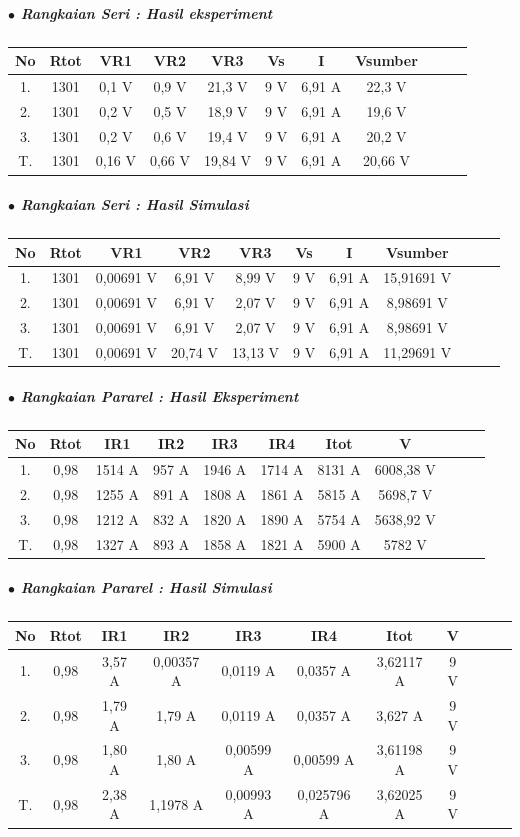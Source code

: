 \documentclass[12pt,a4paper]{article}
\begin{document}
\subparagraph*{$\bullet$ Rangkaian Seri : Hasil eksperiment }
\subparagraph*{ }
\begin{tabular}{|c|c|c|c|c|c|c|c|c|c|c|}        \hline
No & Rtot & VR1 & VR2 & VR3 & Vs & I & Vsumber \\ \hline 
1. & 1301  & 0,1 V & 0,9 V & 21,3 V & 9 V & 6,91 A & 22,3 V \\ \hline
2. & 1301  & 0,2 V & 0,5 V & 18,9 V & 9 V & 6,91 A & 19,6 V \\ \hline
3. & 1301  & 0,2 V & 0,6 V & 19,4 V & 9 V & 6,91 A & 20,2 V  \\ \hline
T. & 1301  & 0,16 V & 0,66 V & 19,84 V & 9 V & 6,91 A & 20,66 V \\ \hline
 \end{tabular}

\subparagraph*{$\bullet$ Rangkaian Seri : Hasil Simulasi }
\subparagraph*{ }
\begin{tabular}{|c|c|c|c|c|c|c|c|c|c|c|}        \hline
No & Rtot & VR1 & VR2 & VR3 & Vs & I & Vsumber \\ \hline 
1. & 1301  & 0,00691 V & 6,91 V & 8,99 V & 9 V & 6,91 A & 15,91691 V  \\ \hline
2. & 1301  & 0,00691 V & 6,91 V & 2,07 V & 9 V & 6,91 A & 8,98691 V  \\ \hline
3. & 1301  & 0,00691 V & 6,91 V & 2,07 V & 9 V & 6,91 A & 8,98691 V \\ \hline
T. & 1301  & 0,00691 V & 20,74 V & 13,13 V & 9 V & 6,91 A & 11,29691 V \\ \hline
 \end{tabular}

\subparagraph*{$\bullet$ Rangkaian Pararel : Hasil Eksperiment }
\subparagraph*{ }
\begin{tabular}{|c|c|c|c|c|c|c|c|c|c|c|}        \hline
No & Rtot & IR1 & IR2 & IR3 & IR4 & Itot & V \\ \hline 
1. & 0,98 & 1514 A & 957 A & 1946 A & 1714 A & 8131 A & 6008,38 V \\ \hline
2. & 0,98 & 1255 A & 891 A & 1808 A & 1861 A & 5815 A & 5698,7 V \\ \hline
3. & 0,98 & 1212 A & 832 A & 1820 A & 1890 A & 5754 A & 5638,92 V \\ \hline
T. & 0,98 & 1327 A & 893 A & 1858 A & 1821 A & 5900 A & 5782 V \\ \hline
 \end{tabular}
 
 \subparagraph*{$\bullet$ Rangkaian Pararel : Hasil Simulasi }
\subparagraph*{ }
\begin{tabular}{|c|c|c|c|c|c|c|c|c|c|c|}        \hline
No & Rtot & IR1 & IR2 & IR3 & IR4 & Itot & V \\ \hline 
1. & 0,98 & 3,57 A & 0,00357 A & 0,0119 A & 0,0357 A & 3,62117 A & 9 V \\ \hline
2. & 0,98 & 1,79 A & 1,79 A & 0,0119 A & 0,0357 A & 3,627 A & 9 V \\ \hline
3. & 0,98 & 1,80 A & 1,80 A & 0,00599 A & 0,00599 A & 3,61198 A & 9 V \\ \hline
T. & 0,98 & 2,38 A & 1,1978 A & 0,00993 A & 0,025796 A & 3,62025 A & 9 V \\ \hline
 \end{tabular}
\end{document}

